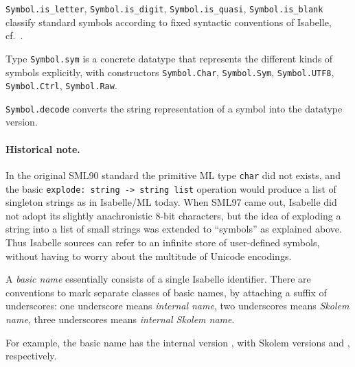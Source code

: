 \begin{isabellebody}
\begin{isamarkuptext}
\begin{description}
  \item \verb|Symbol.is_letter|, \verb|Symbol.is_digit|, \verb|Symbol.is_quasi|, \verb|Symbol.is_blank| classify standard
  symbols according to fixed syntactic conventions of Isabelle, cf.\
  \cite{isabelle-isar-ref}.

  \item Type \verb|Symbol.sym| is a concrete datatype that
  represents the different kinds of symbols explicitly, with
  constructors \verb|Symbol.Char|, \verb|Symbol.Sym|, \verb|Symbol.UTF8|, \verb|Symbol.Ctrl|, \verb|Symbol.Raw|.

  \item \verb|Symbol.decode| converts the string representation of a
  symbol into the datatype version.

  \end{description}

  \paragraph{Historical note.} In the original SML90 standard the
  primitive ML type \verb|char| did not exists, and the basic \verb|explode: string -> string list| operation would produce a list of
  singleton strings as in Isabelle/ML today.  When SML97 came out,
  Isabelle did not adopt its slightly anachronistic 8-bit characters,
  but the idea of exploding a string into a list of small strings was
  extended to ``symbols'' as explained above.  Thus Isabelle sources
  can refer to an infinite store of user-defined symbols, without
  having to worry about the multitude of Unicode encodings.%
\end{isamarkuptext}%
\isamarkuptrue%
%
\endisatagmlref
{\isafoldmlref}%
%
\isadelimmlref
%
\endisadelimmlref
%
\isamarkuptrue%
%
\begin{isamarkuptext}%
A \emph{basic name} essentially consists of a single Isabelle
  identifier.  There are conventions to mark separate classes of basic
  names, by attaching a suffix of underscores: one underscore means
  \emph{internal name}, two underscores means \emph{Skolem name},
  three underscores means \emph{internal Skolem name}.

  For example, the basic name  has the internal version
  \isa{foo{\isacharunderscore}}, with Skolem versions  and , respectively.


\end{isamarkuptext}
\end{isabellebody}
